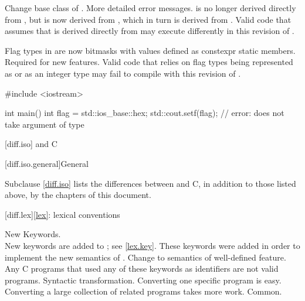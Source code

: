 \change
Change base class of .
\rationale
More detailed error messages.
\effect
{} is no longer derived directly from
, but is now derived from ,
which in turn is derived from . Valid \CppIII{} code
that assumes that  is derived directly from
 may execute differently in this revision of \Cpp{}.

\change
Flag types in  are now bitmasks with values
defined as constexpr static members.
\rationale
Required for new features.
\effect
Valid \CppIII{} code that relies on  flag types being
represented as  or as an integer type may fail to compile
with this revision of \Cpp{}.
\begin{example}
\begin{codeblock}
#include <iostream>

int main() {
  int flag = std::ios_base::hex;
  std::cout.setf(flag);         // error:  does not take argument of type 
}
\end{codeblock}
\end{example}

[diff.iso]{\Cpp{} and C}

[diff.iso.general]{General}

\pnum
{}%
Subclause \ref{diff.iso} lists the differences between \Cpp{} and C,
in addition to those listed above,
by the chapters of this document.

[diff.lex]{\ref*{lex}: lexical conventions}

\change
New Keywords.\\
New keywords are added to \Cpp{};
see \ref{lex.key}.
\rationale
These keywords were added in order to implement the new
semantics of \Cpp{}.
\effect
Change to semantics of well-defined feature.
Any C programs that used any of these keywords as identifiers
are not valid \Cpp{} programs.
\difficulty
Syntactic transformation.
Converting one specific program is easy.
Converting a large collection
of related programs takes more work.
\howwide
Common.


